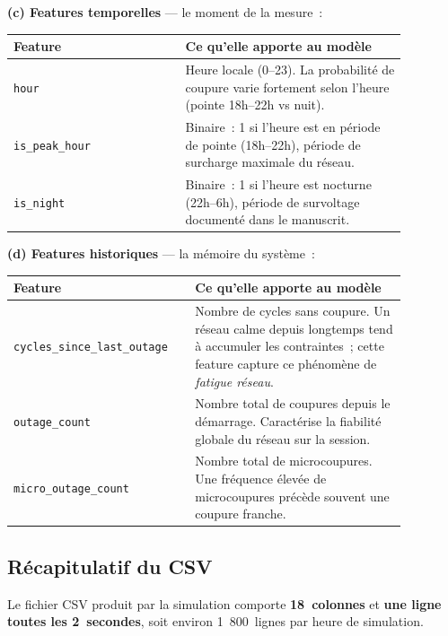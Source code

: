 \documentclass[12pt,a4paper]{article}
\begin{document}
\bigskip
\noindent
\textbf{(c) Features temporelles} — le moment de la mesure~:

\begin{center}
\begin{tabular}{p{0.38\linewidth} p{0.49\linewidth}}
\toprule
\textbf{Feature} & \textbf{Ce qu'elle apporte au modèle} \\
\midrule
\texttt{hour}         &
  Heure locale (0--23). La probabilité de coupure varie fortement
  selon l'heure (pointe 18h--22h vs nuit). \\
\texttt{is\_peak\_hour} &
  Binaire~: 1 si l'heure est en période de pointe (18h--22h),
  période de surcharge maximale du réseau. \\
\texttt{is\_night}    &
  Binaire~: 1 si l'heure est nocturne (22h--6h), période de
  survoltage documenté dans le manuscrit. \\
\bottomrule
\end{tabular}
\end{center}

\bigskip
\noindent
\textbf{(d) Features historiques} — la mémoire du système~:

\begin{center}
\begin{tabular}{p{0.38\linewidth} p{0.49\linewidth}}
\toprule
\textbf{Feature} & \textbf{Ce qu'elle apporte au modèle} \\
\midrule
\texttt{cycles\_since\_last\_outage} &
  Nombre de cycles sans coupure. Un réseau \og{}calme depuis longtemps\fg{}
  tend à accumuler les contraintes~; cette feature capture ce phénomène
  de \emph{fatigue réseau}. \\
\texttt{outage\_count}        &
  Nombre total de coupures depuis le démarrage.
  Caractérise la fiabilité globale du réseau sur la session. \\
\texttt{micro\_outage\_count} &
  Nombre total de microcoupures.
  Une fréquence élevée de microcoupures précède souvent
  une coupure franche. \\
\bottomrule
\end{tabular}
\end{center}

\subsection{Récapitulatif du CSV}

Le fichier CSV produit par la simulation comporte
\textbf{18~colonnes} et \textbf{une ligne toutes les 2~secondes},
soit environ 1~800~lignes par heure de simulation.
\end{document}

